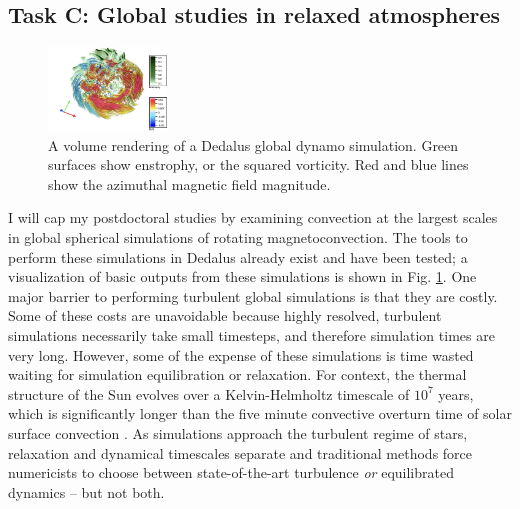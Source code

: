 \documentclass[11pt, preprint]{aastex}
\begin{document}
\vspace{-0.8cm}
\newpage
\subsection*{Task C: Global studies in relaxed atmospheres}
\vspace{-0.3cm}
\label{sct:taskC}

\begin{figure}
	\begin{center}
	\vspace{-14pt}
    \includegraphics[width=0.28\textwidth]{./figs/mdwarf.png}
	\vspace{-16pt}
	\end{center}
    \caption{A volume rendering of a Dedalus global dynamo simulation.
	Green surfaces show enstrophy, or the squared vorticity.
	Red and blue lines show the azimuthal magnetic field magnitude.
	\label{fig:mdwarf} }
	\vspace{-6pt}
\end{figure}
I will cap my postdoctoral studies by examining convection at the largest scales in global spherical simulations of rotating magnetoconvection.
The tools to perform these simulations in Dedalus already exist \citep{lecoanet&all2019} and have been tested; a visualization of basic outputs from these simulations is shown in Fig. \ref{fig:mdwarf}.
One major barrier to performing turbulent global simulations is that they are costly.
Some of these costs are unavoidable because highly resolved, turbulent simulations necessarily take small timesteps, and therefore simulation times are very long.
However, some of the expense of these simulations is time wasted waiting for simulation equilibration or relaxation.
For context, the thermal structure of the Sun evolves over a Kelvin-Helmholtz timescale of $10^7$ years, which is significantly longer than the five minute convective overturn time of solar surface convection \citep{anders&all2018}.
As simulations approach the turbulent regime of stars, relaxation and dynamical timescales separate and traditional methods force numericists to choose between state-of-the-art turbulence \emph{or} equilibrated dynamics -- but not both.
\end{document}
